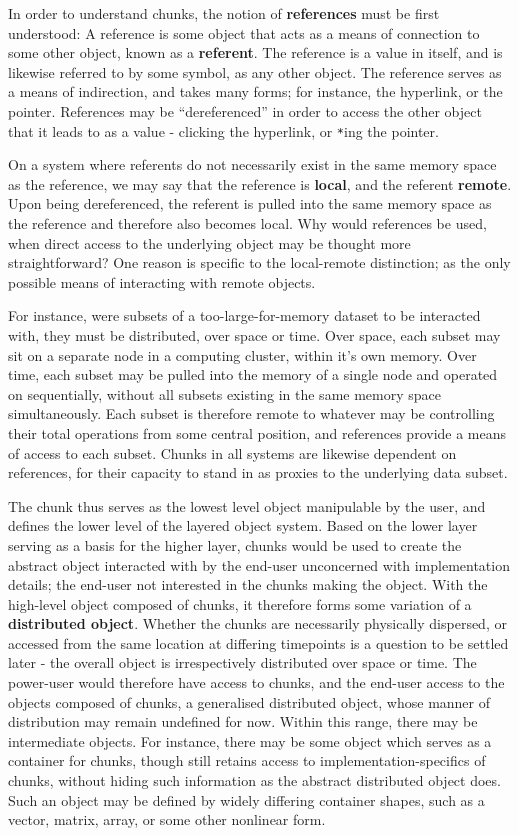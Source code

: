 In order to understand chunks, the notion of \textbf{references} must be
first understood: A reference is some object that acts as a means of
connection to some other object, known as a \textbf{referent}. The
reference is a value in itself, and is likewise referred to by some
symbol, as any other object. The reference serves as a means of
indirection, and takes many forms; for instance, the hyperlink, or the
pointer. References may be ``dereferenced'' in order to access the other
object that it leads to as a value - clicking the hyperlink, or
\texttt{*}ing the pointer.

On a system where referents do not necessarily exist in the same memory
space as the reference, we may say that the reference is \textbf{local},
and the referent \textbf{remote}. Upon being dereferenced, the referent
is pulled into the same memory space as the reference and therefore also
becomes local. Why would references be used, when direct access to the
underlying object may be thought more straightforward? One reason is
specific to the local-remote distinction; as the only possible means of
interacting with remote objects.

For instance, were subsets of a too-large-for-memory dataset to be
interacted with, they must be distributed, over space or time. Over
space, each subset may sit on a separate node in a computing cluster,
within it's own memory. Over time, each subset may be pulled into the
memory of a single node and operated on sequentially, without all
subsets existing in the same memory space simultaneously. Each subset is
therefore remote to whatever may be controlling their total operations
from some central position, and references provide a means of access to
each subset. Chunks in all systems are likewise dependent on references,
for their capacity to stand in as proxies to the underlying data subset.

The chunk thus serves as the lowest level object manipulable by the
user, and defines the lower level of the layered object system. Based on
the lower layer serving as a basis for the higher layer, chunks would be
used to create the abstract object interacted with by the end-user
unconcerned with implementation details; the end-user not interested in
the chunks making the object. With the high-level object composed of
chunks, it therefore forms some variation of a \textbf{distributed
    object}. Whether the chunks are necessarily physically dispersed, or
accessed from the same location at differing timepoints is a question to
be settled later - the overall object is irrespectively distributed over
space or time. The power-user would therefore have access to chunks, and
the end-user access to the objects composed of chunks, a generalised
distributed object, whose manner of distribution may remain undefined
for now. Within this range, there may be intermediate objects. For
instance, there may be some object which serves as a container for
chunks, though still retains access to implementation-specifics of
chunks, without hiding such information as the abstract distributed
object does. Such an object may be defined by widely differing container
shapes, such as a vector, matrix, array, or some other nonlinear form.

